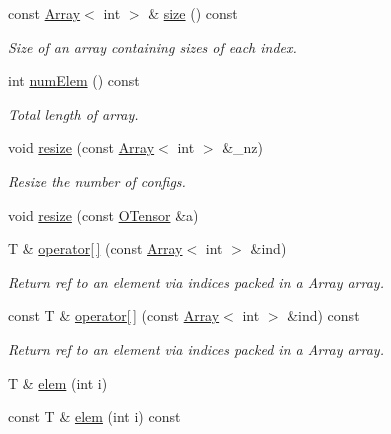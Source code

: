 \begin{DoxyCompactItemize}
const \mbox{\hyperlink{classXMLArray_1_1Array}{Array}}$<$ int $>$ \& \mbox{\hyperlink{classENSEM_1_1OTensor_aa34f5311f161a9b4aef0b08af6fb8d34}{size}} () const
\begin{DoxyCompactList}\small\item\em Size of an array containing sizes of each index. \end{DoxyCompactList}\item 
int \mbox{\hyperlink{classENSEM_1_1OTensor_a30a241a5b4f16fab55fd70ffee52828a}{num\+Elem}} () const
\begin{DoxyCompactList}\small\item\em Total length of array. \end{DoxyCompactList}\item 
void \mbox{\hyperlink{classENSEM_1_1OTensor_abe0bd734d08b1140d7794ec760a89435}{resize}} (const \mbox{\hyperlink{classXMLArray_1_1Array}{Array}}$<$ int $>$ \&\+\_\+nz)
\begin{DoxyCompactList}\small\item\em Resize the number of configs. \end{DoxyCompactList}\item 
void \mbox{\hyperlink{classENSEM_1_1OTensor_aee9b85f3726c01139b9194a3b95809d3}{resize}} (const \mbox{\hyperlink{classENSEM_1_1OTensor}{O\+Tensor}} \&a)
\item 
T \& \mbox{\hyperlink{classENSEM_1_1OTensor_adbfded2bb2af9d68e0a040df0d19b2d6}{operator\mbox{[}$\,$\mbox{]}}} (const \mbox{\hyperlink{classXMLArray_1_1Array}{Array}}$<$ int $>$ \&ind)
\begin{DoxyCompactList}\small\item\em Return ref to an element via indices packed in a Array array. \end{DoxyCompactList}\item 
const T \& \mbox{\hyperlink{classENSEM_1_1OTensor_aa649ae52fc364d173eb02db2fbee8172}{operator\mbox{[}$\,$\mbox{]}}} (const \mbox{\hyperlink{classXMLArray_1_1Array}{Array}}$<$ int $>$ \&ind) const
\begin{DoxyCompactList}\small\item\em Return ref to an element via indices packed in a Array array. \end{DoxyCompactList}\item 
T \& \mbox{\hyperlink{classENSEM_1_1OTensor_a18a4095f1e99228c27768fbea8eec05d}{elem}} (int i)
\item 
const T \& \mbox{\hyperlink{classENSEM_1_1OTensor_a788f146a247856d6b391cfd8f903657b}{elem}} (int i) const
\end{DoxyCompactItemize}


